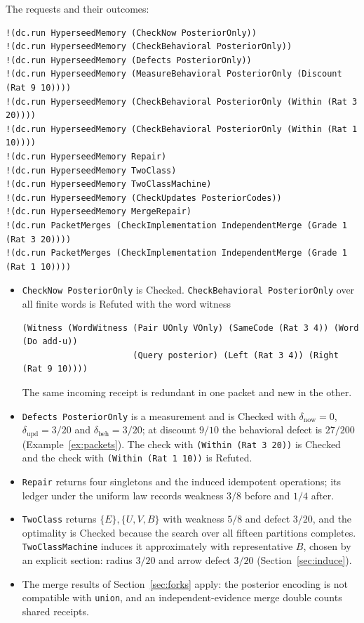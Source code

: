 \documentclass[11pt]{article}
\newcommand{\code}[1]{\texttt{#1}}
\newcommand{\dnow}{\delta_{\mathrm{now}}}
\newcommand{\dupd}{\delta_{\mathrm{upd}}}
\newcommand{\dbd}{\delta_{\mathrm{beh}}}
\theoremstyle{definition}
\theoremstyle{plain}
\begin{document}
The requests and their outcomes:
\begin{lstlisting}[basicstyle=\ttfamily\footnotesize,title={\scriptsize\ttfamily fixtures/receipt\_packets.metta}]
!(dc.run HyperseedMemory (CheckNow PosteriorOnly))
!(dc.run HyperseedMemory (CheckBehavioral PosteriorOnly))
!(dc.run HyperseedMemory (Defects PosteriorOnly))
!(dc.run HyperseedMemory (MeasureBehavioral PosteriorOnly (Discount (Rat 9 10))))
!(dc.run HyperseedMemory (CheckBehavioral PosteriorOnly (Within (Rat 3 20))))
!(dc.run HyperseedMemory (CheckBehavioral PosteriorOnly (Within (Rat 1 10))))
!(dc.run HyperseedMemory Repair)
!(dc.run HyperseedMemory TwoClass)
!(dc.run HyperseedMemory TwoClassMachine)
!(dc.run HyperseedMemory (CheckUpdates PosteriorCodes))
!(dc.run HyperseedMemory MergeRepair)
!(dc.run PacketMerges (CheckImplementation IndependentMerge (Grade 1 (Rat 3 20))))
!(dc.run PacketMerges (CheckImplementation IndependentMerge (Grade 1 (Rat 1 10))))
\end{lstlisting}
\begin{itemize}
\item \code{CheckNow PosteriorOnly} is Checked. \code{CheckBehavioral PosteriorOnly} over all
finite words is Refuted with the word witness
\begin{lstlisting}
(Witness (WordWitness (Pair UOnly VOnly) (SameCode (Rat 3 4)) (Word (Do add-u))
                      (Query posterior) (Left (Rat 3 4)) (Right (Rat 9 10))))
\end{lstlisting}
The same incoming receipt is redundant in one packet and new in the other.
\item \code{Defects PosteriorOnly} is a measurement and is Checked with $\dnow=0$, $\dupd=3/20$ and
$\dbd=3/20$; at discount $9/10$ the behavioral defect is $27/200$ (Example~\ref{ex:packets}). The
check with \code{(Within (Rat 3 20))} is Checked and the check with \code{(Within (Rat 1 10))} is
Refuted.
\item \code{Repair} returns four singletons and the induced idempotent operations; its ledger under
the uniform law records weakness $3/8$ before and $1/4$ after.
\item \code{TwoClass} returns $\{E\},\{U,V,B\}$ with weakness $5/8$ and defect $3/20$, and the
optimality is Checked because the search over all fifteen partitions completes.
\code{TwoClassMachine} induces it approximately with representative $B$, chosen by an explicit
section: radius $3/20$ and arrow defect $3/20$ (Section~\ref{sec:induce}).
\item The merge results of Section~\ref{sec:forks} apply: the posterior encoding is not compatible
with \code{union}, and an independent-evidence merge double counts shared receipts.
\end{itemize}
\end{document}
